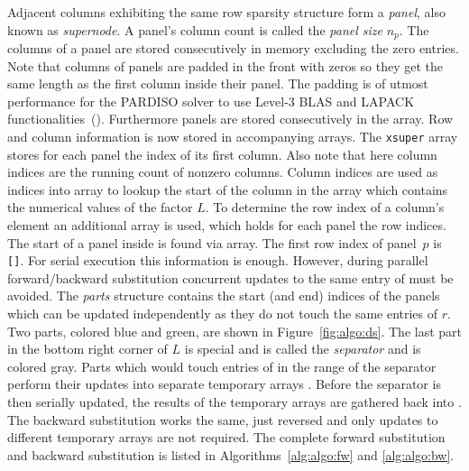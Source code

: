 Adjacent columns exhibiting the same row sparsity structure form a \textit{panel}, also known
as \textit{supernode}.
A panel's column count is called the \textit{panel size} $n_p$.
The columns of a panel are stored consecutively in memory excluding the zero
entries. 
Note that columns of panels are padded in the front with zeros so they get the 
same length as the first column inside their panel. The padding is of utmost performance
for the PARDISO solver to use Level-3 BLAS and LAPACK functionalities~(\cite{20.500.11850/144477}).
 Furthermore panels are stored consecutively in the \vlnz{} array. 
Row and column information is now stored in accompanying arrays.
The \texttt{xsuper} array stores for each panel the index of its first column. 
Also note that here column indices are the running count of nonzero columns.
Column indices are used as indices into \vxlnz{} array to lookup the start of
the column in the \vlnz{} array which contains the numerical values of the factor $L$.
To determine the row index of a column's element an additional array \vindx{} is
used, which holds for each panel the row indices.
The start of a panel inside \vindx{} is found via \vxindx{} array.
The first row index of panel~$p$ is \vindx\texttt{[\vxindx[p]]}.
For serial execution this information is enough. 
However, during parallel forward/backward substitution concurrent updates to
the same entry of \vr{} must be avoided.
The \textit{parts} structure contains the start (and end) indices of the panels which can
be updated independently as they do not touch the same entries of $r$.
Two parts, colored blue and green, are shown in Figure~\ref{fig:algo:ds}.
The last part in the bottom right corner of $L$ is special and is called the 
\textit{separator} and is colored gray.
%
Parts which would touch entries of \vr{} in the range of the separator perform 
their updates into separate temporary arrays \vtemp{}.
Before the separator is then serially updated, the results of the temporary
arrays are gathered back into \vr{}. 
The backward substitution works the same, just reversed and
only updates to different temporary arrays are not required.
The complete forward substitution and backward substitution  is listed in Algorithms~\ref{alg:algo:fw} and \ref{alg:algo:bw}.
%

